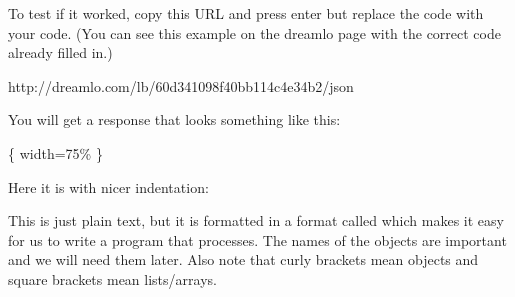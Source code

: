 \documentclass[letterpaper,10pt,english]{sphinxmanual}
\begin{document}
\sphinxAtStartPar
To test if it worked, copy this URL and press enter but replace the code with your  code.  (You can see this example on the dreamlo page with the correct
code already filled in.)

\begin{sphinxVerbatim}[commandchars=\\\{\}]
http://dreamlo.com/lb/60d341098f40bb114c4e34b2/json
\end{sphinxVerbatim}

\sphinxAtStartPar
You will get a response that looks something like this:

\sphinxAtStartPar
{}\{ width=75\% \}

\sphinxAtStartPar
Here it is with nicer indentation:

\begin{sphinxVerbatim}[commandchars=\\\{\}]
      \PYG{p}{[}
      \PYG{p}{]}
\end{sphinxVerbatim}

\sphinxAtStartPar
This is just plain text, but it is formatted in a format called  which makes it easy for us to write a program
that processes.  The names of the objects are important and we will need them later.  Also note that curly brackets mean objects and
square brackets mean lists/arrays.
\end{document}
